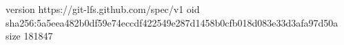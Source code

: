 version https://git-lfs.github.com/spec/v1
oid sha256:5a5eea482b0df59e74eccdf422549e287d1458b0cfb018d083e33d3afa97d50a
size 181847
